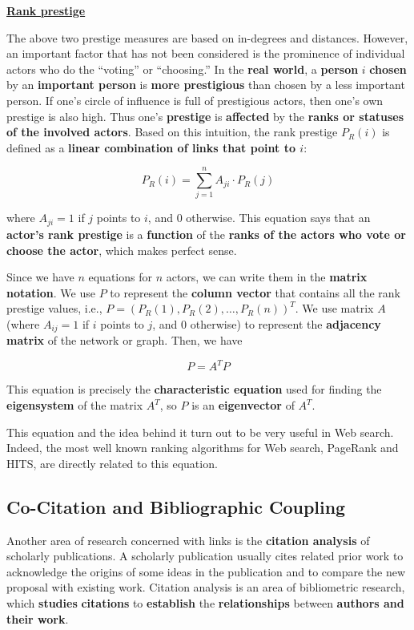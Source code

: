 \underline{\textbf{Rank prestige}}

The above two prestige measures are based on in-degrees and distances. However, an important factor that has not been considered is the prominence of individual actors who do the “voting” or “choosing.” In the \textbf{real world}, a \textbf{person} $i$ \textbf{chosen} by an \textbf{important person} is \textbf{more prestigious} than chosen by a less important person. If one’s circle of influence is full of prestigious actors, then one’s own prestige is also high. Thus one’s \textbf{prestige} is \textbf{affected} by the \textbf{ranks or statuses of the involved actors}. Based on this intuition, the rank prestige $P_R(i)$ is defined as a \textbf{linear combination of links that point to $i$}:

$$
P_R(i) = \sum_{j = 1}^n A_{ji} \cdot P_R(j)
$$

where $A_{ji} = 1$ if $j$ points to $i$, and 0 otherwise. This equation says that an \textbf{actor’s rank prestige} is a \textbf{function} of the \textbf{ranks of the actors who vote or choose the actor}, which makes perfect sense. 

Since we have $n$ equations for $n$ actors, we can write them in the \textbf{matrix notation}. We use $P$ to represent the \textbf{column vector} that contains all the rank prestige values, i.e., $P = (P_R(1), P_R(2), …, P_R(n))^T$. We use matrix $A$ (where $A_{ij} = 1$ if $i$ points to $j$, and 0 otherwise) to represent the \textbf{adjacency matrix} of the network or graph. Then, we have

$$
P = A^T P
$$

This equation is precisely the \textbf{characteristic equation} used for finding the \textbf{eigensystem} of the matrix $A^T$, so \textbf{$P$} is an \textbf{eigenvector} of $A^T$. 

This equation and the idea behind it turn out to be very useful in Web search. Indeed, the most well known ranking algorithms for Web search, PageRank and HITS, are directly related to this equation. 

\subsection{Co-Citation and Bibliographic Coupling}
Another area of research concerned with links is the \textbf{citation analysis} of scholarly publications. A scholarly publication usually cites related prior work to acknowledge the origins of some ideas in the publication and to compare the new proposal with existing work. Citation analysis is an area of bibliometric research, which \textbf{studies} \textbf{citations} to \textbf{establish} the \textbf{relationships} between \textbf{authors and their work}.

